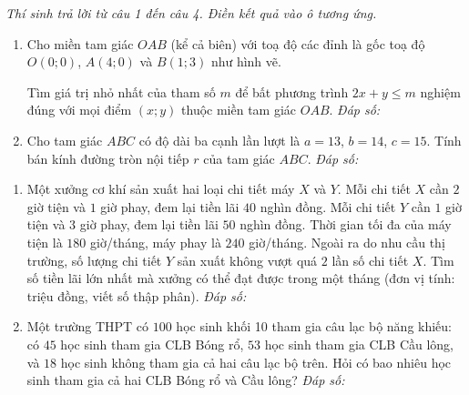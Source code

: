 \documentclass[12pt,a4paper]{article}
\newcommand{\parttitle}[1]{\par\vspace{1.5pt}\needspace{2\baselineskip}{\large\bfseries\color{ink}#1}\par\nopagebreak\vspace{1pt}}
\newcommand{\answerbox}{\hfill\textit{Đáp số:}\ \fbox{\rule{0pt}{9pt}\hspace{2.2cm}}}
\begin{document}
\parttitle{PHẦN III. Trắc nghiệm trả lời ngắn}
\textit{Thí sinh trả lời từ câu 1 đến câu 4. Điền kết quả vào ô tương ứng.}
\begin{enumerate}
\item Cho miền tam giác $OAB$ (kể cả biên) với toạ độ các đỉnh là gốc toạ độ $O(0; 0)$, $A(4; 0)$ và $B(1; 3)$ như hình vẽ.

\begin{center}
\vspace{-4pt}
\vspace{-6pt}
\end{center}

Tìm giá trị nhỏ nhất của tham số $m$ để bất phương trình $2x + y \le m$ nghiệm đúng với mọi điểm $(x; y)$ thuộc miền tam giác $OAB$.
\answerbox

\item Cho tam giác $ABC$ có độ dài ba cạnh lần lượt là $a = 13$, $b = 14$, $c = 15$. Tính bán kính đường tròn nội tiếp $r$ của tam giác $ABC$.
\answerbox
\end{enumerate}
\newpage

\begin{enumerate}[resume]
\item Một xưởng cơ khí sản xuất hai loại chi tiết máy $X$ và $Y$. Mỗi chi tiết $X$ cần $2$ giờ tiện và $1$ giờ phay, đem lại tiền lãi $40$ nghìn đồng. Mỗi chi tiết $Y$ cần $1$ giờ tiện và $3$ giờ phay, đem lại tiền lãi $50$ nghìn đồng. Thời gian tối đa của máy tiện là $180$ giờ/tháng, máy phay là $240$ giờ/tháng. Ngoài ra do nhu cầu thị trường, số lượng chi tiết $Y$ sản xuất không vượt quá $2$ lần số chi tiết $X$. Tìm số tiền lãi lớn nhất mà xưởng có thể đạt được trong một tháng (đơn vị tính: triệu đồng, viết số thập phân).
\answerbox

\item Một trường THPT có $100$ học sinh khối 10 tham gia câu lạc bộ năng khiếu: có $45$ học sinh tham gia CLB Bóng rổ, $53$ học sinh tham gia CLB Cầu lông, và $18$ học sinh không tham gia cả hai câu lạc bộ trên. Hỏi có bao nhiêu học sinh tham gia cả hai CLB Bóng rổ và Cầu lông?
\answerbox
\end{enumerate}
\end{document}

